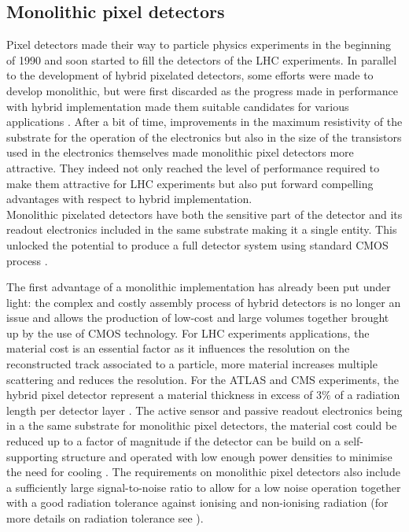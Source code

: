 		
		\subsection{Monolithic pixel detectors }\label{subsec:2.4.2}
		
		Pixel detectors made their way to particle physics experiments in the beginning of 1990 and soon started to fill the detectors of the LHC experiments. In parallel to the development of hybrid pixelated detectors, some efforts were made to develop monolithic, but were first discarded as the progress made in performance with hybrid implementation made them suitable candidates for various applications \cite{pixel_wheredowestand}. After a bit of time, improvements in the maximum resistivity of the substrate for the operation of the electronics but also in the size of the transistors used in the electronics themselves made monolithic pixel detectors more attractive. They indeed not only reached the level of performance required to make them attractive for LHC experiments but also put forward compelling advantages with respect to hybrid implementation. \\
		
		Monolithic pixelated detectors have both the sensitive part of the detector and its readout electronics included in the same substrate making it a single entity. This unlocked the potential to produce a full detector system using standard CMOS process \cite{Picardi_thesis}. 
		
		The first advantage of a monolithic implementation has already been put under light: the complex and costly assembly process of hybrid detectors is no longer an issue and allows the production of low-cost and large volumes together brought up by the use of CMOS technology. For LHC experiments applications, the material cost is an essential factor as it influences the resolution on the reconstructed track associated to a particle, more material increases multiple scattering and reduces the resolution. For the ATLAS and CMS experiments, the hybrid pixel detector represent a material thickness in excess of 3$\%$ of a radiation length per detector layer \cite{detectors}. The active sensor and passive readout electronics being in a the same substrate for monolithic pixel detectors, the material cost could be reduced up to a factor of magnitude if the detector can be build on a self-supporting structure and operated with low enough power densities to minimise the need for cooling \cite{detectors}. The requirements on monolithic pixel detectors also include a sufficiently large signal-to-noise ratio to allow for a low noise operation together with a good radiation tolerance against ionising and non-ionising radiation (for more details on radiation tolerance see ). 
		
